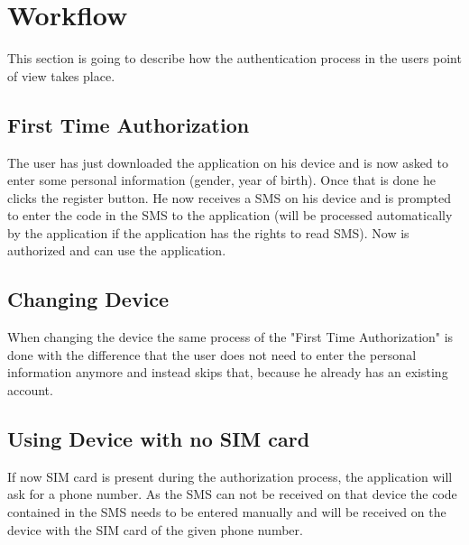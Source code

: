 \section{Workflow} %
This section is going to describe how the authentication process in the users point of view takes place.
\label{Workflow} %

\subsection{First Time Authorization}
The user has just downloaded the application on his device and is now asked to enter some personal information (gender, year of birth). Once that is done he clicks the register button. He now receives a SMS on his device and is prompted to enter the code in the SMS to the application (will be processed automatically by the application if the application has the rights to read SMS). Now is authorized and can use the application.

\subsection{Changing Device}
When changing the device the same process of the "First Time Authorization" is done with the difference that the user does not need to enter the personal information anymore and instead skips that, because he already has an existing account.

\subsection{Using Device with no SIM card}
If now SIM card is present during the authorization process, the application will ask for a phone number. As the SMS can not be received on that device the code contained in the SMS needs to be entered manually and will be received on the device with the SIM card of the given phone number.